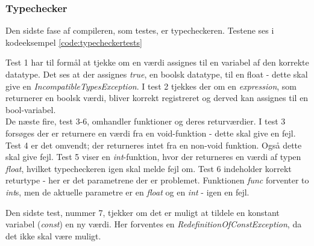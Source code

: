 \subsubsection{Typechecker}
Den sidste fase af compileren, som testes, er typecheckeren. Testene ses i kodeeksempel \ref{code:typecheckertests}


\noindent Test 1 har til formål at tjekke om en værdi assignes til en variabel af den korrekte datatype. Det ses at der assignes \textit{true}, en boolsk datatype, til en float - dette skal give en \textit{IncompatibleTypesException}.
\noindent I test 2 tjekkes der om en \textit{expression}, som returnerer en boolsk værdi, bliver korrekt registreret og derved kan assignes til en bool-variabel. \\

\noindent De næste fire, test 3-6, omhandler funktioner og deres returværdier. I test 3 forsøges der er returnere en værdi fra en void-funktion - dette skal give en fejl. Test 4 er det omvendt; der returneres intet fra en non-void funktion. Også dette skal give fejl. Test 5 viser en \textit{int}-funktion, hvor der returneres en værdi af typen \textit{float}, hvilket typecheckeren igen skal melde fejl om. Test 6 indeholder korrekt returtype - her er det parametrene der er problemet. Funktionen \textit{func} forventer to \textit{int}s, men de aktuelle parametre er en \textit{float} og en \textit{int} - igen en fejl.

\noindent Den sidste test, nummer 7,  tjekker om det er muligt at tildele en konstant variabel (\textit{const}) en ny værdi. Her forventes en \textit{RedefinitionOfConstException}, da det ikke skal være muligt.